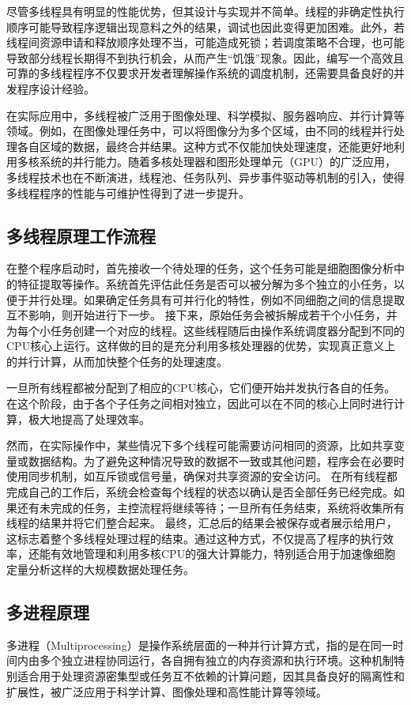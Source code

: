 尽管多线程具有明显的性能优势，但其设计与实现并不简单。线程的非确定性执行顺序可能导致程序逻辑出现意料之外的结果，调试也因此变得更加困难。此外，若线程间资源申请和释放顺序处理不当，可能造成死锁；若调度策略不合理，也可能导致部分线程长期得不到执行机会，从而产生“饥饿”现象。因此，编写一个高效且可靠的多线程程序不仅要求开发者理解操作系统的调度机制，还需要具备良好的并发程序设计经验。

在实际应用中，多线程被广泛用于图像处理、科学模拟、服务器响应、并行计算等领域。例如，在图像处理任务中，可以将图像分为多个区域，由不同的线程并行处理各自区域的数据，最终合并结果。这种方式不仅能加快处理速度，还能更好地利用多核系统的并行能力。随着多核处理器和图形处理单元（GPU）的广泛应用，多线程技术也在不断演进，线程池、任务队列、异步事件驱动等机制的引入，使得多线程程序的性能与可维护性得到了进一步提升。
\subsection{多线程原理工作流程}
在整个程序启动时，首先接收一个待处理的任务，这个任务可能是细胞图像分析中的特征提取等操作。系统首先评估此任务是否可以被分解为多个独立的小任务，以便于并行处理。如果确定任务具有可并行化的特性，例如不同细胞之间的信息提取互不影响，则开始进行下一步。
接下来，原始任务会被拆解成若干个小任务，并为每个小任务创建一个对应的线程。这些线程随后由操作系统调度器分配到不同的CPU核心上运行。这样做的目的是充分利用多核处理器的优势，实现真正意义上的并行计算，从而加快整个任务的处理速度。

一旦所有线程都被分配到了相应的CPU核心，它们便开始并发执行各自的任务。在这个阶段，由于各个子任务之间相对独立，因此可以在不同的核心上同时进行计算，极大地提高了处理效率。

然而，在实际操作中，某些情况下多个线程可能需要访问相同的资源，比如共享变量或数据结构。为了避免这种情况导致的数据不一致或其他问题，程序会在必要时使用同步机制，如互斥锁或信号量，确保对共享资源的安全访问。
在所有线程都完成自己的工作后，系统会检查每个线程的状态以确认是否全部任务已经完成。如果还有未完成的任务，主控流程将继续等待；一旦所有任务结束，系统将收集所有线程的结果并将它们整合起来。
最终，汇总后的结果会被保存或者展示给用户，这标志着整个多线程处理过程的结束。通过这种方式，不仅提高了程序的执行效率，还能有效地管理和利用多核CPU的强大计算能力，特别适合用于加速像细胞定量分析这样的大规模数据处理任务。
\subsection{多进程原理}
多进程（Multiprocessing）是操作系统层面的一种并行计算方式，指的是在同一时间内由多个独立进程协同运行，各自拥有独立的内存资源和执行环境。这种机制特别适合用于处理资源密集型或任务互不依赖的计算问题，因其具备良好的隔离性和扩展性，被广泛应用于科学计算、图像处理和高性能计算等领域\cite{ref15}。

